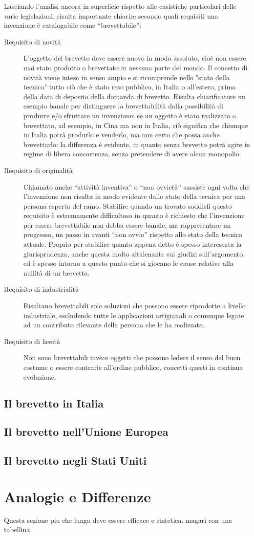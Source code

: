 Lasciando l'analisi ancora in superficie rispetto alle casistiche particolari delle varie legislazioni, risulta importante chiarire secondo quali requisiti una invenzione è catalogabile come ``brevettabile'':
\begin{description}
 \item[Requisito di novità] L'oggetto del brevetto deve essere nuovo in modo assoluto, cioè non essere mai stato prodotto o brevettato in nessuna parte del mondo. Il concetto di novità viene inteso in senso ampio e si ricomprende nello "stato della tecnica" tutto ciò che è stato reso pubblico, in Italia o all’estero, prima della data di deposito della domanda di brevetto. Risulta chiarificatore un esempio banale per distinguere la brevettabilità dalla possibilità di produrre e/o sfruttare un invenzione: se un oggetto è stato realizzato o brevettato, ad esempio, in Cina ma non in Italia, ciò significa che chiunque in Italia potrà produrlo e venderlo, ma non certo che possa anche brevettarlo: la differenza è evidente, in quanto senza brevetto potrà agire in regime di libera concorrenza, senza pretendere di avere alcun monopolio.
\item [Requisito di originalità] Chiamato anche ``attività inventiva'' o ``non ovvietà'' sussiste ogni volta che l'invenzione non risulta in modo evidente dallo stato della tecnica per una persona esperta del ramo. Stabilire quando un trovato soddisfi questo requisito è estremamente difficoltoso in quanto è richiesto che l'invenzione per essere brevettabile non debba essere banale, ma rappresentare un progresso, un passo in avanti ``non ovvio'' rispetto allo stato della tecnica attuale. Proprio per stabilire quanto appena detto è spesso interessata la giurisprudenza, anche questa molto altalenante sui giudizi sull’argomento, ed è spesso intorno a questo punto che si giocano le cause relative alla nullità di un brevetto. 
\item [Requisito di industrialità]Risultano brevettabili solo soluzioni che possono essere riprodotte a livello industriale, escludendo tutte le applicazioni artigianali o comunque legate ad un contributo rilevante della persona che le ha realizzate.
\item [Requisito di liceità]Non sono brevettabili invece oggetti che possono ledere il senso del buon costume o essere contrarie all'ordine pubblico, concetti questi in continua evoluzione.
 \end{description}
\subsection{Il brevetto in Italia}
\subsection{Il brevetto nell'Unione Europea}
\subsection{Il brevetto negli Stati Uniti}
\section{Analogie e Differenze}
Questa sezione piu che lunga deve essere efficace e sintetica. magari con una tabellina
